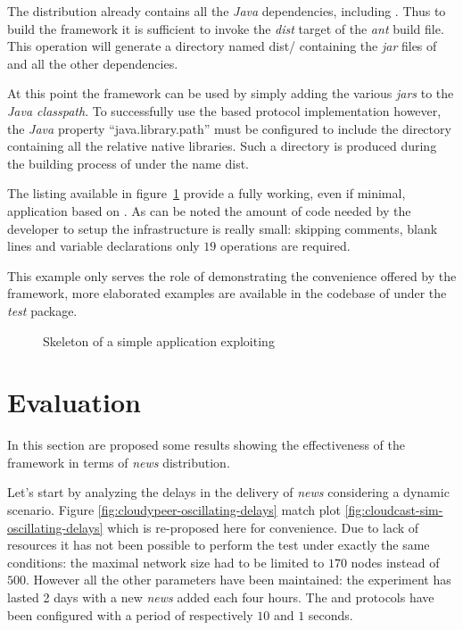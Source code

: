 The distribution already contains all the \textit{Java} dependencies,
including \jgrapes. Thus to build the framework it is sufficient to invoke the
\textit{dist} target of the \textit{ant} build file. This operation will
generate a directory named \textsf{dist/} containing the \textit{jar}
files of \cloudypeer and all the other dependencies.

At this point the framework can be used by simply adding the various
\textit{jars} to the \textit{Java classpath}. To successfully use the
\jgrapes based \peersampling protocol implementation however, the
\textit{Java} property ``java.library.path'' must be configured
to include the directory containing all the relative native
libraries. Such a directory is produced during the building process of
\jgrapes under the name \textsf{dist}.

The listing available in figure~\ref{lst:cloudypeer-example-app}
provide a fully working, even if minimal, application based on \cloudypeer.
As can be noted the amount of code needed by the developer to setup
the \cloudcast infrastructure is really small: skipping comments,
blank lines and variable declarations only $19$ operations are
required.

This example only serves the role of demonstrating the convenience
offered by the framework, more elaborated examples are available in
the codebase of \cloudypeer under the \textit{test} package.

\begin{figure}[H]
  
  \hspace{-100pt}
  \caption{Skeleton of a simple application exploiting \cloudypeer}
  \label{lst:cloudypeer-example-app}
\end{figure}

\section{Evaluation}
In this section are proposed some results showing the
effectiveness of the framework in terms of \textit{news}
distribution.

Let's start by analyzing the delays in the delivery of \textit{news}
considering a dynamic scenario. Figure
\ref{fig:cloudypeer-oscillating-delays} match plot
\ref{fig:cloudcast-sim-oscillating-delays} which is re-proposed here
for convenience. Due to lack of resources it has not been possible to
perform the test under exactly the same conditions: the maximal network
size had to be limited to $170$ nodes instead of $500$. However all
the other parameters have been maintained: the experiment has lasted 2
days with a new
\textit{news} added each four hours. The \antientropy and
\rumormongering protocols have been configured with a period of
respectively $10$ and $1$ seconds.

